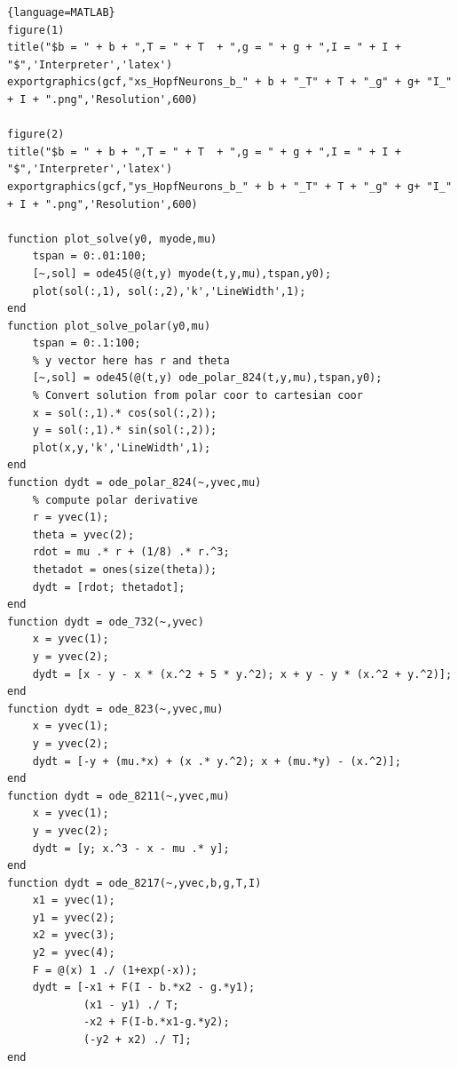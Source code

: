 \documentclass[11pt]{article}
\begin{document}
\begin{lstlisting}{language=MATLAB}
figure(1)
title("$b = " + b + ",T = " + T  + ",g = " + g + ",I = " + I + "$",'Interpreter','latex')
exportgraphics(gcf,"xs_HopfNeurons_b_" + b + "_T" + T + "_g" + g+ "I_" + I + ".png",'Resolution',600)

figure(2)
title("$b = " + b + ",T = " + T  + ",g = " + g + ",I = " + I + "$",'Interpreter','latex')
exportgraphics(gcf,"ys_HopfNeurons_b_" + b + "_T" + T + "_g" + g+ "I_" + I + ".png",'Resolution',600)

function plot_solve(y0, myode,mu)
    tspan = 0:.01:100;
    [~,sol] = ode45(@(t,y) myode(t,y,mu),tspan,y0);
    plot(sol(:,1), sol(:,2),'k','LineWidth',1);
end 
function plot_solve_polar(y0,mu)
    tspan = 0:.1:100;    
    % y vector here has r and theta 
    [~,sol] = ode45(@(t,y) ode_polar_824(t,y,mu),tspan,y0);
    % Convert solution from polar coor to cartesian coor 
    x = sol(:,1).* cos(sol(:,2));
    y = sol(:,1).* sin(sol(:,2));
    plot(x,y,'k','LineWidth',1);
end 
function dydt = ode_polar_824(~,yvec,mu)
    % compute polar derivative
    r = yvec(1);
    theta = yvec(2);
    rdot = mu .* r + (1/8) .* r.^3;
    thetadot = ones(size(theta));
    dydt = [rdot; thetadot];
end
function dydt = ode_732(~,yvec)
    x = yvec(1);
    y = yvec(2);
    dydt = [x - y - x * (x.^2 + 5 * y.^2); x + y - y * (x.^2 + y.^2)];
end
function dydt = ode_823(~,yvec,mu)
    x = yvec(1);
    y = yvec(2);
    dydt = [-y + (mu.*x) + (x .* y.^2); x + (mu.*y) - (x.^2)];
end
function dydt = ode_8211(~,yvec,mu)
    x = yvec(1);
    y = yvec(2);
    dydt = [y; x.^3 - x - mu .* y];
end
function dydt = ode_8217(~,yvec,b,g,T,I)
    x1 = yvec(1);
    y1 = yvec(2);
    x2 = yvec(3);
    y2 = yvec(4);
    F = @(x) 1 ./ (1+exp(-x));
    dydt = [-x1 + F(I - b.*x2 - g.*y1); 
            (x1 - y1) ./ T;
            -x2 + F(I-b.*x1-g.*y2);
            (-y2 + x2) ./ T];
end
\end{lstlisting}
\end{document}
